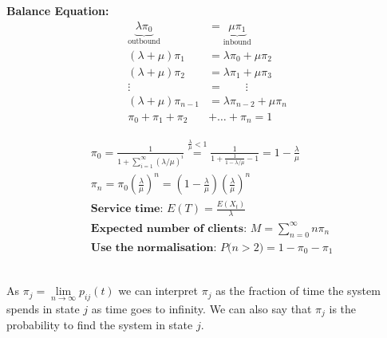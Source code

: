 \begin{minipage}{5.5cm}
	\textbf{Balance Equation:}
	\begin{align}
		\underbrace{\lambda\pi_0}_{\text{outbound}}			&=\underbrace{\mu\pi_1}_{\text{inbound}}						\nonumber\\[0.25cm]
		(\lambda+\mu)\pi_1		&=\lambda\pi_0+\mu\pi_2	\nonumber\\[0.25cm]
		(\lambda+\mu)\pi_2		&=\lambda\pi_1+\mu\pi_3	\nonumber\\[0.25cm]
		\vdots\qquad			&=\qquad\vdots							\nonumber\\[0.25cm]
		(\lambda+\mu)\pi_{n-1}	&=\lambda\pi_{n-2}+\mu\pi_{n}	\nonumber\\[0.25cm]
		\pi_0+\pi_1+\pi_2&+\ldots+\pi_n=1\nonumber
	\end{align}
\end{minipage}
\hfill
\begin{minipage}{13.5cm}
	\begin{align}
		&\pi_0=\frac{1}{1+\sum\limits_{i=1}^{\infty}{\left(\lambda/\mu\right)^i}}\overset{\frac{\lambda}{\mu}<1}{=}\frac{1}{1+\frac{1}{1-\lambda/\mu}-1}=1-\frac\lambda\mu\nonumber\\[0.25cm]
		&\pi_n=\pi_0\left(\frac{\lambda}{\mu}\right)^n=\left(1-\frac{\lambda}{\mu}\right)\left(\frac\lambda\mu\right)^n\nonumber\\[0.5cm]
		&\textbf{Service time: }E(T)=\frac{E(X_t)}{\lambda}\nonumber\\ %
		&\textbf{Expected number of clients: }M=\sum\limits_{n=0}^{\infty}{n\pi_n}\nonumber\\
		&\textbf{Use the normalisation: } P\big(n>2\big)=1-\pi_0-\pi_1\nonumber
	\end{align}
\end{minipage} \\

As $\pi_j=\lim\limits_{n\rightarrow \infty}{p_{ij}(t)}$ we can interpret $\pi_j$ as the fraction of time the system 
spends in state $j$ as time goes to infinity. We can also say that $\pi_j$ is the probability to find the system in state $j$.

\vfill



 

